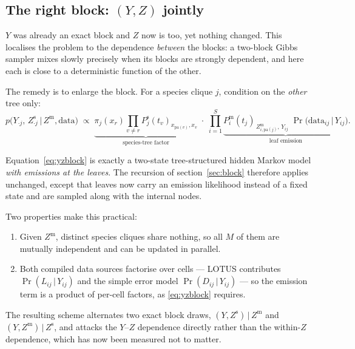 \documentclass[11pt,a4paper]{article}
\newcommand{\Ys}{Y}
\newcommand{\Zs}{Z^{\mathrm{s}}}
\newcommand{\Zm}{Z^{\mathrm{m}}}
\newcommand{\pa}{\mathrm{pa}}
\newcommand{\given}{\,\vert\,}
\begin{document}
\subsection{The right block: \texorpdfstring{$(\Ys, Z)$}{(Y,Z)} jointly}
\label{sec:yzblock}

$\Ys$ was already an exact block and $Z$ now is too, yet nothing changed. This localises the
problem to the dependence \emph{between} the blocks: a two-block Gibbs sampler mixes slowly
precisely when its blocks are strongly dependent, and here each is close to a deterministic
function of the other.

The remedy is to enlarge the block. For a species clique $j$, condition on the \emph{other}
tree only:
\begin{equation}
  p\bigl(\Ys_{\cdot j},\, \Zs_{\cdot j} \given \Zm, \text{data}\bigr)
  \;\propto\;
  \underbrace{\pi_j(x_{r})\prod_{v\ne r} P^{\mathrm{s}}_j(t_v)_{x_{\pa(v)},x_v}}
             _{\text{species-tree factor}}
  \;\cdot\;
  \prod_{i=1}^{S}
  \underbrace{P^{\mathrm{m}}_i(t_j)_{\,\Zm_{i,\pa(j)},\,\Ys_{ij}}\;
              \Pr\bigl(\text{data}_{ij}\given \Ys_{ij}\bigr)}_{\text{leaf emission}} .
  \label{eq:yzblock}
\end{equation}

Equation~\eqref{eq:yzblock} is exactly a two-state tree-structured hidden Markov model
\emph{with emissions at the leaves}. The recursion of section~\ref{sec:block} therefore
applies unchanged, except that leaves now carry an emission likelihood instead of a fixed
state and are sampled along with the internal nodes.

Two properties make this practical:
\begin{enumerate}[label=(\roman*)]
  \item Given $\Zm$, distinct species cliques share nothing, so all $M$ of them are mutually
        independent and can be updated in parallel.
  \item Both compiled data sources factorise over cells --- LOTUS contributes
        $\Pr(L_{ij}\given \Ys_{ij})$ and the simple error model
        $\Pr(D_{ij}\given \Ys_{ij})$ --- so the emission term is a product of per-cell
        factors, as \eqref{eq:yzblock} requires.
\end{enumerate}

The resulting scheme alternates two exact block draws,
$(\Ys, \Zs)\given \Zm$ and $(\Ys, \Zm)\given \Zs$, and attacks the $\Ys$--$Z$ dependence
directly rather than the within-$Z$ dependence, which has now been measured not to matter.
\end{document}
